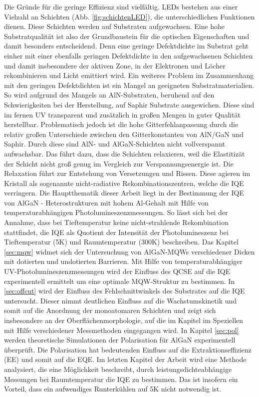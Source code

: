 Die Gründe für die geringe Effizienz sind vielfältig. LEDs bestehen aus einer Vielzahl an Schichten (Abb. \ref{fig:schichtenLED}), die unterschiedlichen Funktionen dienen. Diese Schichten werden auf Substraten aufgewachsen. Eine hohe Substratqualität ist also der Grundbaustein für die optischen Eigenschaften und damit besonders entscheidend. Denn eine geringe Defektdichte im Substrat geht einher mit einer ebenfalls geringen Defektdichte in den aufgewachsenen Schichten und damit insbesondere der aktiven Zone, in der Elektronen und Löcher rekombinieren und Licht emittiert wird. Ein weiteres Problem im Zusammenhang mit den geringen Defektdichten ist ein Mangel an geeigneten Substratmaterialien. So wird aufgrund des Mangels an AlN-Substraten, beruhend auf den Schwierigkeiten bei der Herstellung, auf Saphir Substrate ausgewichen. Diese sind im fernen UV transparent und zusätzlich in großen Mengen in guter Qualität herstellbar. Problematisch jedoch ist die hohe Gitterfehlanpassung durch die relativ großen Unterschiede zwischen den Gitterkonstanten von AlN/GaN und Saphir. Durch diese sind AlN- und AlGaN-Schichten nicht vollverspannt aufwachsbar. Das führt dazu, dass die Schichten relaxieren, weil die Elastitizät der Schicht nicht groß genug im Vergleich zur Verspannungsenergie ist. Die Relaxation führt zur Entstehung von Versetzungen und Rissen. Diese agieren im Kristall als sogenannte nicht-radiative Rekombinationszentren, welche die IQE verringern. Die Hauptthematik dieser Arbeit liegt in der  Bestimmung der IQE von AlGaN - Heterostrukturen mit hohem Al-Gehalt mit Hilfe von temperaturabhängigen Photolumineszenzmessungen.
So lässt sich bei der Annahme, dass bei Tieftemperatur keine nicht-strahlende Rekombination stattfindet, die IQE als Quotient der Intensität der Photolumineszenz bei Tieftemperatur (5K) und Raumtemperatur (300K) beschreiben.  
Das Kapitel \ref{sec:mqw} widmet sich der Untersuchung von AlGaN-MQWs verschiedener Dicken mit dotierten und undotierten Barrieren. Mit Hilfe von temperaturabhängiger UV-Photolumineszenzmessungen wird der Einfluss des QCSE auf die IQE experimentell ermittelt um eine optimale MQW-Struktur zu bestimmen.
In \ref{sec:offcut} wird der Einfluss des Fehlschnittwinkels des Substrates auf die IQE untersucht. Dieser nimmt deutlichen Einfluss auf die Wachstumskinetik und somit auf die Anordnung der monoatomaren Schichten und zeigt sich insbesondere an der Oberflächenmorphologie, auf die im Kapitel im Speziellen mit Hilfe verschiedener Messmethoden eingegangen wird.
In Kapitel \ref{sec:pol} werden theoretische Simulationen der Polarisation für AlGaN experimentell überprüft. Die Polarisation hat bedeutenden Einfluss auf die Extraktionseffizienz (EE) und somit auf die EQE.
Im letzten Kapitel der Arbeit wird eine Methode analysiert, die eine Möglichkeit beschreibt, durch leistungsdichteabhängige Messungen bei Raumtemperatur die IQE zu bestimmen. Das ist insofern ein Vorteil, dass ein aufwendiges Runterkühlen auf 5K nicht notwendig ist. 













